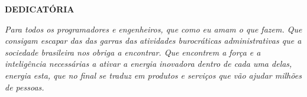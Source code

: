 \begin{dedicatoria}
\begin{center}
\textbf{DEDICATÓRIA}\\  
\end{center}

\vspace*{\fill}


\begin{flushright}
 \textit{
 Para todos os programadores e engenheiros, 
 que como eu amam o que fazem. 
 Que consigam escapar das das garras das atividades burocráticas administrativas 
 que a sociedade brasileira nos obriga a encontrar. 
 Que encontrem a força e a inteligência necessárias a ativar a energia inovadora dentro de cada uma delas, 
 energia esta, que no final se traduz em produtos e serviços que vão ajudar milhões de pessoas.} 
  

\end{flushright}


\end{dedicatoria}
